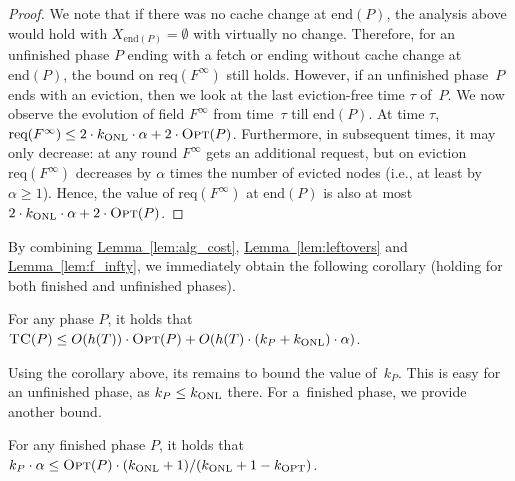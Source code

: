 \documentclass[sigconf,screen=true]{acmart}
\newcommand{\lref}[2][]{\hyperref[#2]{#1~\ref*{#2}}}
\newcommand{\ALG}{\textsc{TC}\xspace}
\newcommand{\OPT}{\textsc{Opt}\xspace}
\newcommand{\req}{\textrm{req}}
\newcommand{\enP}{\textrm{end}(P)}
\newcommand{\kALG}{k_\textnormal{ONL}}
\newcommand{\kOPT}{k_\textnormal{OPT}}
\begin{document}
\begin{proof}
We note that if there was no cache change at $\enP$, the analysis above would
hold with $X_{\enP} = \emptyset$ with virtually no change. Therefore, for an
unfinished phase $P$ ending with a fetch or ending without cache change at
$\enP$, the bound on $\req(F^\infty)$ still holds. However, if an unfinished
phase~$P$ ends with an eviction, then we look at the last eviction-free 
time $\tau$ of~$P$. We now observe the evolution of field
$F^\infty$ from time~$\tau$ till $\enP$. At time $\tau$, $\req(F^\infty) \leq
2 \cdot \kALG \cdot \alpha + 2 \cdot \OPT(P)$. Furthermore, in subsequent
times, it may only decrease: at any round $F^\infty$ gets an additional
request, but on eviction $\req(F^\infty)$ decreases by $\alpha$ times
the number of evicted nodes (i.e., at least by $\alpha \geq 1$). Hence, the
value of $\req(F^\infty)$ at $\enP$ is also at most $2 \cdot \kALG \cdot
\alpha + 2 \cdot \OPT(P)$.
\end{proof}



By combining \lref[Lemma]{lem:alg_cost}, \lref[Lemma]{lem:leftovers} and 
\lref[Lemma]{lem:f_infty}, we immediately obtain the following corollary
(holding for both finished and unfinished phases).

\begin{corollary}
\label{cor:any_phase_bound}
For any phase $P$, it holds that 
$\ALG(P) \leq O(h(T)) \cdot \OPT(P) + O(h(T) \cdot (k_P + \kALG) \cdot \alpha)$.
\end{corollary}

Using the corollary above, its remains to bound the value of~$k_P$. This is
easy for an unfinished phase, as $k_P \leq \kALG$ there. For a~finished phase,
we provide another bound.

\begin{lemma}
\label{lem:opt_bound2}
For any finished phase $P$, it holds that
$k_P \cdot \alpha \leq \OPT(P) \cdot (\kALG + 1) / (\kALG + 1 - \kOPT)$.
\end{lemma}
\end{document}
